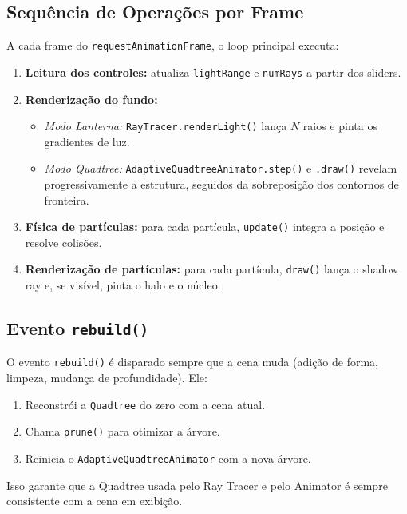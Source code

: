 \documentclass[11pt,a4paper]{article}
\theoremstyle{plain}
\theoremstyle{definition}
\begin{document}
\subsection{Sequência de Operações por Frame}

A cada frame do \texttt{requestAnimationFrame}, o loop principal executa:

\begin{enumerate}
    \item \textbf{Leitura dos controles:} atualiza \texttt{lightRange} e
    \texttt{numRays} a partir dos sliders.
    \item \textbf{Renderização do fundo:}
    \begin{itemize}
        \item \emph{Modo Lanterna:} \texttt{RayTracer.renderLight()} lança $N$
        raios e pinta os gradientes de luz.
        \item \emph{Modo Quadtree:} \texttt{AdaptiveQuadtreeAnimator.step()} e
        \texttt{.draw()} revelam progressivamente a estrutura, seguidos da
        sobreposição dos contornos de fronteira.
    \end{itemize}
    \item \textbf{Física de partículas:} para cada partícula, \texttt{update()}
    integra a posição e resolve colisões.
    \item \textbf{Renderização de partículas:} para cada partícula, \texttt{draw()}
    lança o shadow ray e, se visível, pinta o halo e o núcleo.
\end{enumerate}

\subsection{Evento \texttt{rebuild()}}

O evento \texttt{rebuild()} é disparado sempre que a cena muda (adição de forma,
limpeza, mudança de profundidade). Ele:
\begin{enumerate}
    \item Reconstrói a \texttt{Quadtree} do zero com a cena atual.
    \item Chama \texttt{prune()} para otimizar a árvore.
    \item Reinicia o \texttt{AdaptiveQuadtreeAnimator} com a nova árvore.
\end{enumerate}

Isso garante que a Quadtree usada pelo Ray Tracer e pelo Animator é sempre
consistente com a cena em exibição.
\end{document}
